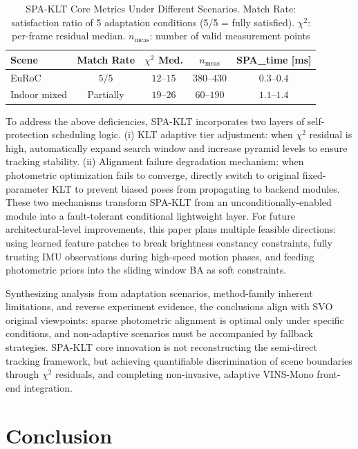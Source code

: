 \documentclass[journal,twoside,web]{ieeecolor}
\begin{document}
\begin{table}[!t]
\centering
\caption{SPA-KLT Core Metrics Under Different Scenarios. Match Rate: satisfaction ratio of 5 adaptation conditions (5/5 = fully satisfied). $\chi^{2}$: per-frame residual median. $n_{\mathrm{meas}}$: number of valid measurement points}
\label{tab:spa_quality}
\begin{tabular}{|l|c|c|c|c|}
\hline
Scene & Match Rate & $\chi^{2}$ Med. & $n_{\mathrm{meas}}$ & SPA\_time [ms] \\
\hline
EuRoC & $5/5$ & $12$--$15$ & $380$--$430$ & $0.3$--$0.4$ \\
\hline
Indoor mixed & Partially & $19$--$26$ & $60$--$190$ & $1.1$--$1.4$ \\
\hline
\end{tabular}
\end{table}

To address the above deficiencies, SPA-KLT incorporates two layers of self-protection scheduling logic. (i) KLT adaptive tier adjustment: when $\chi^{2}$ residual is high, automatically expand search window and increase pyramid levels to ensure tracking stability. (ii) Alignment failure degradation mechanism: when photometric optimization fails to converge, directly switch to original fixed-parameter KLT to prevent biased poses from propagating to backend modules. These two mechanisms transform SPA-KLT from an unconditionally-enabled module into a fault-tolerant conditional lightweight layer. For future architectural-level improvements, this paper plans multiple feasible directions: using learned feature patches to break brightness constancy constraints, fully trusting IMU observations during high-speed motion phases, and feeding photometric priors into the sliding window BA as soft constraints.

Synthesizing analysis from adaptation scenarios, method-family inherent limitations, and reverse experiment evidence, the conclusions align with SVO original viewpoints: sparse photometric alignment is optimal only under specific conditions, and non-adaptive scenarios must be accompanied by fallback strategies. SPA-KLT core innovation is not reconstructing the semi-direct tracking framework, but achieving quantifiable discrimination of scene boundaries through $\chi^{2}$ residuals, and completing non-invasive, adaptive VINS-Mono front-end integration.

\section{Conclusion}
\end{document}
